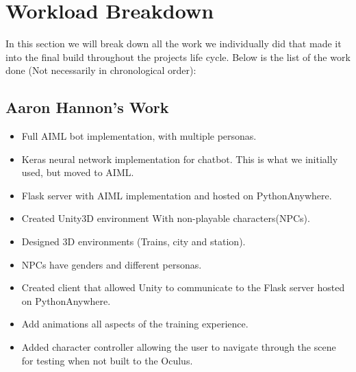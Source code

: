 \section{Workload Breakdown}
In this section we will break down all the work we individually did that made it into the final build throughout the projects life cycle. Below is the list of the work done (Not necessarily in chronological order):

\subsection{Aaron Hannon's Work}
\begin{itemize}
    \item Full AIML bot implementation, with multiple personas.
    \item Keras neural network implementation for chatbot. This is what we initially used, but moved to AIML.
    \item Flask server with AIML implementation and hosted on PythonAnywhere.
    \item Created Unity3D environment With non-playable characters(NPCs).
    \item Designed 3D environments (Trains, city and station).
    \item NPCs have genders and different personas.
    \item Created client that allowed Unity to communicate to the Flask server hosted on PythonAnywhere.
    \item Add animations all aspects of the training experience.
    \item Added character controller allowing the user to navigate through the scene for testing when not built to the Oculus.
\end{itemize}

